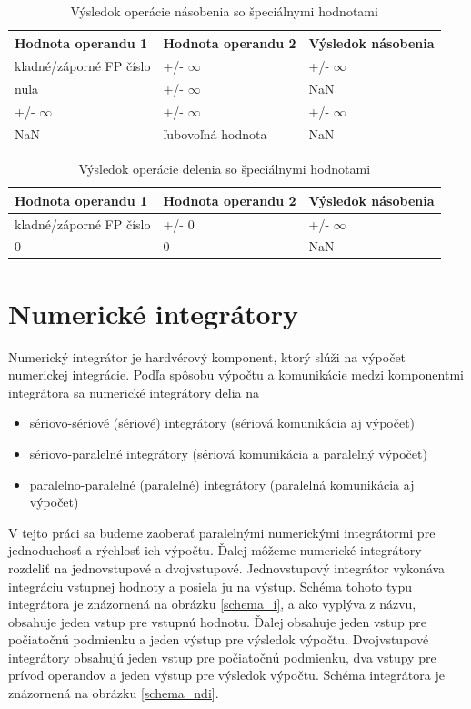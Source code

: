 \begin{table}[h]
\centering
\begin{tabular}{|l|l|l|}
\hline
\rowcolor[HTML]{C0C0C0} 
Hodnota operandu 1 & Hodnota operandu 2 & Výsledok násobenia \\ \hline
kladné/záporné FP číslo & +/- $ \infty $ & +/- $ \infty $ \\ \hline
nula           & +/- $ \infty $ & NaN \\ \hline
+/- $ \infty $ & +/- $ \infty $ & +/- $ \infty $ \\ \hline
NaN & ľubovoľná hodnota & NaN \\ \hline
\end{tabular}
\caption{Výsledok operácie násobenia so špeciálnymi hodnotami}
\label{special_nasobenie}
\end{table}

\begin{table}[h]
\centering
\begin{tabular}{|l|l|l|}
\hline
\rowcolor[HTML]{C0C0C0} 
Hodnota operandu 1 & Hodnota operandu 2 & Výsledok násobenia \\ \hline
kladné/záporné FP číslo & +/- 0 & +/- $ \infty $ \\ \hline
0 & 0 & NaN \\ \hline
\end{tabular}
\caption{Výsledok operácie delenia so špeciálnymi hodnotami}
\label{special_delenie}
\end{table}

\chapter{Numerické integrátory} \label{NUM_INTEGRATORY}
Numerický integrátor je hardvérový komponent, ktorý slúži na výpočet numerickej integrácie. Podľa spôsobu výpočtu a komunikácie medzi komponentmi integrátora sa numerické integrátory delia na

\begin{itemize}
\item sériovo-sériové (sériové) integrátory (sériová komunikácia aj výpočet)
\item sériovo-paralelné integrátory (sériová komunikácia a paralelný výpočet)
\item paralelno-paralelné (paralelné) integrátory (paralelná komunikácia aj výpočet)
\end{itemize}

V tejto práci sa budeme zaoberať paralelnými numerickými integrátormi pre jednoduchosť a rýchlosť ich výpočtu. Ďalej môžeme numerické integrátory rozdeliť na jednovstupové a dvojvstupové. Jednovstupový integrátor vykonáva integráciu vstupnej hodnoty a posiela ju na výstup. Schéma tohoto typu integrátora je znázornená na obrázku \ref{schema_i}, a ako vyplýva z názvu, obsahuje jeden vstup pre vstupnú hodnotu. Ďalej obsahuje jeden vstup pre počiatočnú podmienku a jeden výstup pre výsledok výpočtu. Dvojvstupové integrátory obsahujú jeden vstup pre počiatočnú podmienku, dva vstupy pre prívod operandov a jeden výstup pre výsledok výpočtu. Schéma integrátora je znázornená na obrázku \ref{schema_ndi}.


